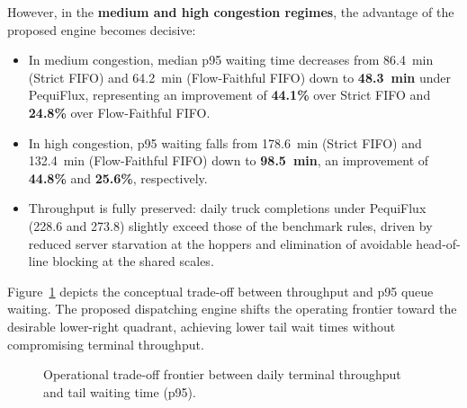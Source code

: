 \documentclass[11pt,a4paper]{article}
\begin{document}
However, in the \textbf{medium and high congestion regimes}, the advantage of the proposed engine becomes decisive:
\begin{itemize}[leftmargin=1.2cm,itemsep=0pt,topsep=2pt]
  \item In medium congestion, median p95 waiting time decreases from 86.4~min (Strict FIFO) and 64.2~min (Flow-Faithful FIFO) down to \textbf{48.3~min} under PequiFlux, representing an improvement of \textbf{44.1\%} over Strict FIFO and \textbf{24.8\%} over Flow-Faithful FIFO.
  \item In high congestion, p95 waiting falls from 178.6~min (Strict FIFO) and 132.4~min (Flow-Faithful FIFO) down to \textbf{98.5~min}, an improvement of \textbf{44.8\%} and \textbf{25.6\%}, respectively.
  \item Throughput is fully preserved: daily truck completions under PequiFlux (228.6 and 273.8) slightly exceed those of the benchmark rules, driven by reduced server starvation at the hoppers and elimination of avoidable head-of-line blocking at the shared scales.
\end{itemize}

Figure~\ref{fig:tradeoff} depicts the conceptual trade-off between throughput and p95 queue waiting. The proposed dispatching engine shifts the operating frontier toward the desirable lower-right quadrant, achieving lower tail wait times without compromising terminal throughput.

\begin{figure}[H]
\centering
{}
\caption{Operational trade-off frontier between daily terminal throughput and tail waiting time (p95).}
\label{fig:tradeoff}
\end{figure}
\end{document}
